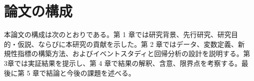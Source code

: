 \section{論文の構成}

本論文の構成は次のとおりである。第 1 章では研究背景、先行研究、研究目的・仮説、ならびに本研究の貢献を示した。第 2 章ではデータ、変数定義、新規性指標の構築方法、およびイベントスタディと回帰分析の設計を説明する。第 3章では実証結果を提示し、第 4 章で結果の解釈、含意、限界点を考察する。最後に第 5 章で結論と今後の課題を述べる。
